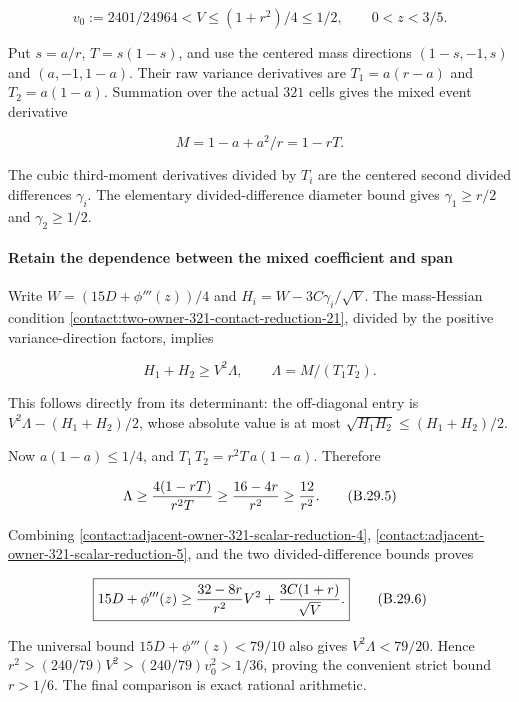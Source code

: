 \[
 v_0:=2401/24964<V\le(1+r^2)/4\le1/2,\qquad 0<z<3/5.
\tag{B.29.2}\label{contact:adjacent-owner-321-scalar-reduction-2}
\]

Put $s=a/r$, $T=s(1-s)$, and use the centered mass directions
$(1-s,-1,s)$ and $(a,-1,1-a)$. Their raw variance derivatives are
$T_1=a(r-a)$ and $T_2=a(1-a)$. Summation over the actual $321$ cells gives
the mixed event derivative

\[
 M=1-a+a^2/r=1-rT.
\tag{B.29.3}\label{contact:adjacent-owner-321-scalar-reduction-3}
\]

The cubic third-moment derivatives divided by $T_i$ are the centered second
divided differences $\gamma_i$. The elementary divided-difference diameter
bound gives $\gamma_1\ge r/2$ and $\gamma_2\ge 1/2$.

\paragraph{Retain the dependence between the mixed coefficient and span}

Write $W=(15D+\phi'''(z))/4$ and
$H_i=W-3C \gamma_i/\sqrt{V}$. The mass-Hessian condition
\eqref{contact:two-owner-321-contact-reduction-21}, divided by the positive variance-direction factors,
implies

\[
 H_1+H_2\ge V^2\Lambda,\qquad \Lambda=M/(T_1T_2).
\tag{B.29.4}\label{contact:adjacent-owner-321-scalar-reduction-4}
\]

This follows directly from its determinant: the off-diagonal entry is
$V^2 \Lambda-(H_1+H_2)/2$, whose absolute value is at most
$\sqrt{H_1H_2}\le (H_1+H_2)/2$.

Now $a(1-a)\le 1/4$, and
$T_1\,T_2=r^2 T\,a(1-a)$. Therefore

\[
 \Lambda\ge {4(1-rT)\over r^2T}
 \ge {16-4r\over r^2}\ge{12\over r^2}.
\tag{B.29.5}\label{contact:adjacent-owner-321-scalar-reduction-5}
\]

Combining \eqref{contact:adjacent-owner-321-scalar-reduction-4}, \eqref{contact:adjacent-owner-321-scalar-reduction-5}, and the two divided-difference bounds proves

\[
 \boxed{15D+\phi'''(z)\ge
 {32-8r\over r^2}V^2+{3C(1+r)\over\sqrt V}.}
\tag{B.29.6}\label{contact:adjacent-owner-321-scalar-reduction-6}
\]

The universal bound $15D+\phi'''(z)<79/10$ also gives
$V^2 \Lambda<79/20$. Hence
$r^2>(240/79)V^2>(240/79)v_0^2>1/36$, proving the convenient
strict bound $r>1/6$. The final comparison is exact rational arithmetic.

